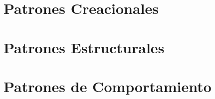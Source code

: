 \documentclass[12pt, oneside]{book}
\begin{document}


\tableofcontents
\listoffigures
\newpage



\part{Patrones Creacionales}







\part{Patrones Estructurales}









\part{Patrones de Comportamiento}
















\end{document}
